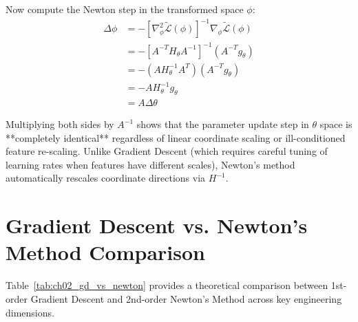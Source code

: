 Now compute the Newton step in the transformed space $\phi$:
\begin{align}
\Delta \phi &= - \left[ \nabla_\phi^2 \tilde{\mathcal{L}}(\phi) \right]^{-1} \nabla_\phi \tilde{\mathcal{L}}(\phi) \\
&= - \left[ A^{-T} H_\theta A^{-1} \right]^{-1} \left( A^{-T} g_\theta \right) \\
&= - \left( A H_\theta^{-1} A^T \right) \left( A^{-T} g_\theta \right) \\
&= - A H_\theta^{-1} g_\theta \\
&= A \Delta \theta
\end{align}

Multiplying both sides by $A^{-1}$ shows that the parameter update step in $\theta$ space is **completely identical** regardless of linear coordinate scaling or ill-conditioned feature re-scaling. Unlike Gradient Descent (which requires careful tuning of learning rates when features have different scales), Newton's method automatically rescales coordinate directions via $H^{-1}$.


\section{Gradient Descent vs. Newton's Method Comparison}
Table~\ref{tab:ch02_gd_vs_newton} provides a theoretical comparison between 1st-order Gradient Descent and 2nd-order Newton's Method across key engineering dimensions.

